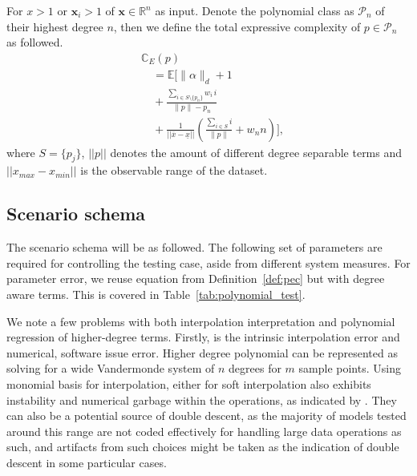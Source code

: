 \documentclass[
  journal=largetwo,
  year=2025,
  volume=37,
]{cup-journal}
\begin{document}
\begin{definition}\label{def:pec}
    For $x>1$ or $\mathbf{x}_{i}>1$ of $\mathbf{x}\in\mathbb{R}^{n}$ as input. Denote the polynomial class as $\mathcal{P}_{n}$ of their highest degree $n$, then we define the total expressive complexity of $p\in \mathcal{P}_{n}$ as followed.
\begin{equation}
    \begin{split}
        &\mathbb{C}_{E}(p)\\
& \quad = \mathbb{E}\!\Bigg[
\lVert \alpha \rVert_{d} + 1\\
& \quad + \frac{\sum_{i\in S\setminus\{p_{n}\}} w_i\,i}{\|p\|-p_{n}}\\
&\quad + \frac{1}{||\overline{x}-\underline{x}||}\!\left(
\frac{\sum_{i\in S} i}{\lVert p\rVert } + w_{n}n
\right)
\Bigg],
    \end{split}
\end{equation}
    where $S=\{p_{j}\}$, $||p||$ denotes the amount of different degree separable terms and $||x_{max}-x_{min}||$ is the observable range of the dataset. 
\end{definition}

\subsection{Scenario schema}
The scenario schema will be as followed. The following set of parameters are required for controlling the testing case, aside from different system measures. For parameter error, we reuse equation from Definition~\ref{def:pec} but with degree aware terms. This is covered in Table~\ref{tab:polynomial_test}.

We note a few problems with both interpolation interpretation and polynomial regression of higher-degree terms. Firstly, is the intrinsic interpolation error and numerical, software issue error. Higher degree polynomial can be represented as solving for a wide Vandermonde system of $n$ degrees for $m$ sample points. Using monomial basis for interpolation, either for soft interpolation also exhibits instability and numerical garbage within the operations, as indicated by \cite{Shen_2025}. They can also be a potential source of double descent, as the majority of models tested around this range are not coded effectively for handling large data operations as such, and artifacts from such choices might be taken as the indication of double descent in some particular cases. 
\end{document}
